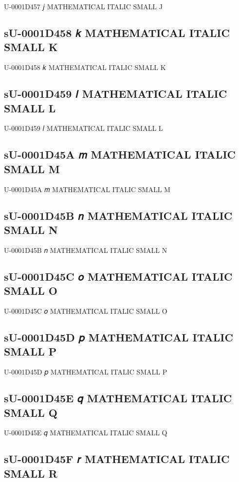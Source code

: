U-0001D457 𝑗 MATHEMATICAL ITALIC SMALL J

\subsection{sU-0001D458 𝑘 MATHEMATICAL ITALIC SMALL K}

U-0001D458 𝑘 MATHEMATICAL ITALIC SMALL K

\subsection{sU-0001D459 𝑙 MATHEMATICAL ITALIC SMALL L}

U-0001D459 𝑙 MATHEMATICAL ITALIC SMALL L

\subsection{sU-0001D45A 𝑚 MATHEMATICAL ITALIC SMALL M}

U-0001D45A 𝑚 MATHEMATICAL ITALIC SMALL M

\subsection{sU-0001D45B 𝑛 MATHEMATICAL ITALIC SMALL N}

U-0001D45B 𝑛 MATHEMATICAL ITALIC SMALL N

\subsection{sU-0001D45C 𝑜 MATHEMATICAL ITALIC SMALL O}

U-0001D45C 𝑜 MATHEMATICAL ITALIC SMALL O

\subsection{sU-0001D45D 𝑝 MATHEMATICAL ITALIC SMALL P}

U-0001D45D 𝑝 MATHEMATICAL ITALIC SMALL P

\subsection{sU-0001D45E 𝑞 MATHEMATICAL ITALIC SMALL Q}

U-0001D45E 𝑞 MATHEMATICAL ITALIC SMALL Q

\subsection{sU-0001D45F 𝑟 MATHEMATICAL ITALIC SMALL R}

